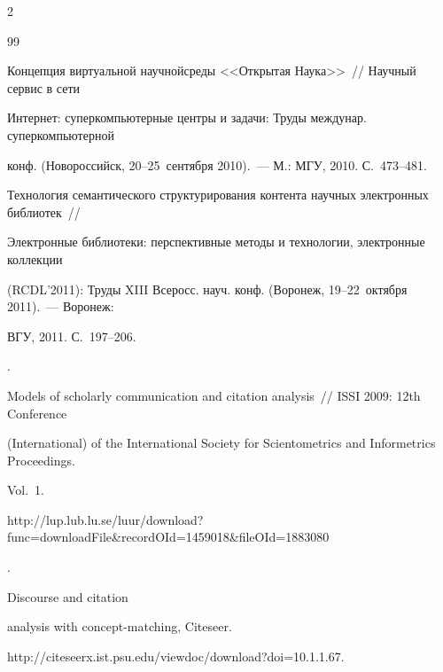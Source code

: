 \begin{multicols}{2}
{{\begin{thebibliography}{99}




Концепция виртуальной научной\linebreak среды <<Открытая Наука>>~// Научный сервис в сети 


Интернет: суперкомпьютерные центры и задачи: \mbox{Труды} междунар. суперкомпьютерной 


конф. (Новороссийск, 20--25~сентября 2010).~--- М.: МГУ, 2010. С.~473--481. 












Технология семантического структурирования контента научных электронных библиотек~// 


Электронные библиотеки: перспективные методы и технологии, электронные коллекции 


(RCDL'2011): Труды XIII Всеросс. науч. конф. (Воронеж, 19--22~октября 2011).~--- Воронеж: 


ВГУ, 2011. С.~197--206.







. 


Models of scholarly communication and citation analysis~// ISSI 2009: 12th  Conference 


(International)  of the International Society for Scientometrics and Informetrics Proceedings. 


Vol.~1. {\sf 


http://lup.lub.lu.se/luur/download?func=downloadFile\linebreak \&recordOId=1459018\&fileOId=1883080}.









Discourse and citation 


analysis with concept-matching, Citeseer. {\sf 


http://\linebreak citeseerx.ist.psu.edu/viewdoc/download?doi=10.1.1.67.\linebreak


}
\end{thebibliography}}}
\end{multicols}
